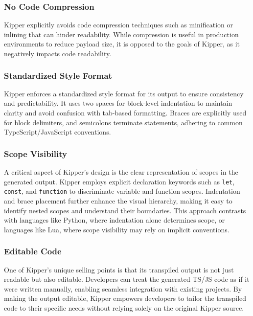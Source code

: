 \subsubsection{No Code Compression}

Kipper explicitly avoids code compression techniques such as minification or inlining that can hinder readability. While compression is useful in production environments to reduce payload size, it is opposed to the goals of Kipper, as it negatively impacts code readability.

\subsubsection{Standardized Style Format}

Kipper enforces a standardized style format for its output to ensure consistency and predictability. It uses two spaces for block-level indentation to maintain clarity and avoid confusion with tab-based formatting. Braces are explicitly used for block delimiters, and semicolons terminate statements, adhering to common TypeScript/JavaScript conventions.

\subsubsection{Scope Visibility}

A critical aspect of Kipper's design is the clear representation of scopes in the generated output. Kipper employs explicit declaration keywords such as \lstinline|let|, \lstinline|const|, and \lstinline|function| to discriminate variable and function scopes. Indentation and brace placement further enhance the visual hierarchy, making it easy to identify nested scopes and understand their boundaries. This approach contrasts with languages like Python, where indentation alone determines scope, or languages like Lua, where scope visibility may rely on implicit conventions.

\subsubsection{Editable Code}

One of Kipper's unique selling points is that its transpiled output is not just readable but also editable. Developers can treat the generated TS/JS code as if it were written manually, enabling seamless integration with existing projects. By making the output editable, Kipper empowers developers to tailor the transpiled code to their specific needs without relying solely on the original Kipper source.

